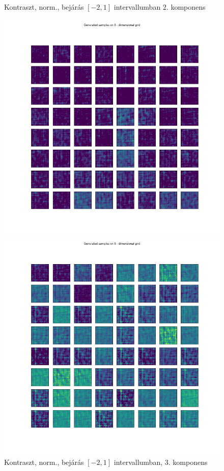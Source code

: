 \documentclass[12pt, english]{article}
\begin{document}
\begin{figure}[H]
\begin{minipage}{0.5\linewidth}
    \caption{Kontraszt, norm., bejárás $[-2, 1]$ \newline intervallumban $2.$ komponens} 
    \label{fig:contrast-norm-sweep-2}
  \end{minipage}
\end{figure}


\begin{figure}[H]
  \begin{minipage}{0.5\linewidth}
    \centering
    \includegraphics[width=.85\linewidth]{sweep/norm_contrast_sweep_minus_two_to_one_3rd_param.png} 
    \caption{Kontraszt, norm., bejárás $[-2, 1]$ \newline  intervallumban, $3.$ komponens} 
    \label{fig:contrast-norm-sweep-3}
  \end{minipage}
  \begin{minipage}{0.5\linewidth}
    \centering
    \includegraphics[width=.85\linewidth]{sweep/norm_contrast_sweep_zero_to_two_6th_param.png} 

\end{minipage}
\end{figure}
\end{document}
